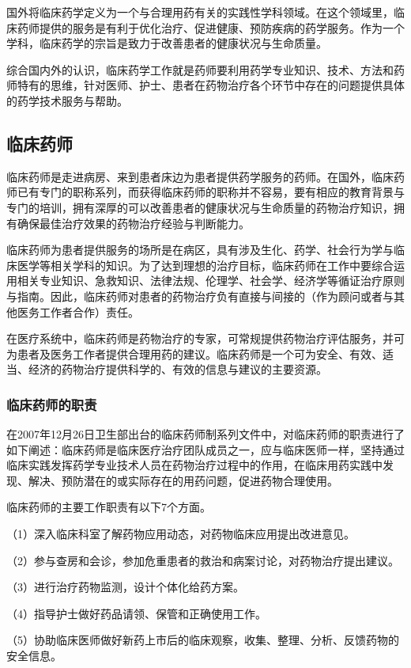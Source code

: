 国外将临床药学定义为一个与合理用药有关的实践性学科领域。在这个领域里，临床药师提供的服务是有利于优化治疗、促进健康、预防疾病的药学服务。作为一个学科，临床药学的宗旨是致力于改善患者的健康状况与生命质量。

综合国内外的认识，临床药学工作就是药师要利用药学专业知识、技术、方法和药师特有的思维，针对医师、护士、患者在药物治疗各个环节中存在的问题提供具体的药学技术服务与帮助。

\subsection{临床药师}

临床药师是走进病房、来到患者床边为患者提供药学服务的药师。在国外，临床药师已有专门的职称系列，而获得临床药师的职称并不容易，要有相应的教育背景与专门的培训，拥有深厚的可以改善患者的健康状况与生命质量的药物治疗知识，拥有确保最佳治疗效果的药物治疗经验与判断能力。

临床药师为患者提供服务的场所是在病区，具有涉及生化、药学、社会行为学与临床医学等相关学科的知识。为了达到理想的治疗目标，临床药师在工作中要综合运用相关专业知识、急救知识、法律法规、伦理学、社会学、经济学等循证治疗原则与指南。因此，临床药师对患者的药物治疗负有直接与间接的（作为顾问或者与其他医务工作者合作）责任。

在医疗系统中，临床药师是药物治疗的专家，可常规提供药物治疗评估服务，并可为患者及医务工作者提供合理用药的建议。临床药师是一个可为安全、有效、适当、经济的药物治疗提供科学的、有效的信息与建议的主要资源。

\subsubsection{临床药师的职责}

在2007年12月26日卫生部出台的临床药师制系列文件中，对临床药师的职责进行了如下阐述：临床药师是临床医疗治疗团队成员之一，应与临床医师一样，坚持通过临床实践发挥药学专业技术人员在药物治疗过程中的作用，在临床用药实践中发现、解决、预防潜在的或实际存在的用药问题，促进药物合理使用。

临床药师的主要工作职责有以下7个方面。

（1）深入临床科室了解药物应用动态，对药物临床应用提出改进意见。

（2）参与查房和会诊，参加危重患者的救治和病案讨论，对药物治疗提出建议。

（3）进行治疗药物监测，设计个体化给药方案。

（4）指导护士做好药品请领、保管和正确使用工作。

（5）协助临床医师做好新药上市后的临床观察，收集、整理、分析、反馈药物的安全信息。

